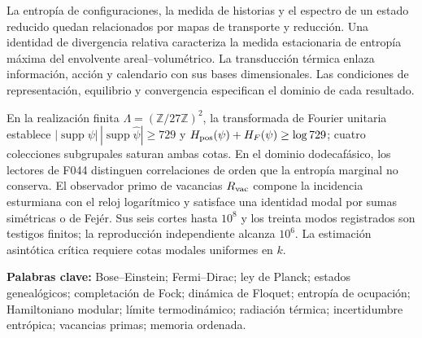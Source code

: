 La entropía de configuraciones, la medida de historias y el espectro de
un estado reducido quedan relacionados por mapas de transporte y
reducción. Una identidad de divergencia relativa caracteriza la medida
estacionaria de entropía máxima del envolvente areal--volumétrico.
La transducción térmica enlaza información, acción y calendario con sus
bases dimensionales. Las condiciones de representación, equilibrio y
convergencia especifican el dominio de cada resultado.

En la realización finita \(\Lambda=(\mathbb Z/27\mathbb Z)^2\), la
transformada de Fourier unitaria establece
\(|\operatorname{supp}\psi|\allowbreak\,|\operatorname{supp}\widehat\psi|\ge729\)
y \(H_{\rm pos}(\psi)\allowbreak+H_F(\psi)\ge\log729\); cuatro colecciones subgrupales
saturan ambas cotas. En el dominio dodecafásico, los lectores de F044
distinguen correlaciones de orden que la entropía marginal no conserva.
El observador primo de vacancias \(R_{\rm vac}\) compone la incidencia
esturmiana con el reloj logarítmico y satisface una identidad modal por
sumas simétricas o de Fejér. Sus seis cortes hasta \(10^8\) y los treinta
modos registrados son testigos finitos; la reproducción independiente
alcanza \(10^6\). La estimación asintótica crítica requiere cotas modales
uniformes en \(k\).

\medskip
\noindent\textbf{Palabras clave:} Bose--Einstein; Fermi--Dirac; ley de Planck;
estados genealógicos; completación de Fock; dinámica de Floquet;
entropía de ocupación; Hamiltoniano modular; límite termodinámico;
radiación térmica; incertidumbre entrópica; vacancias primas; memoria
ordenada.
\par\endgroup
